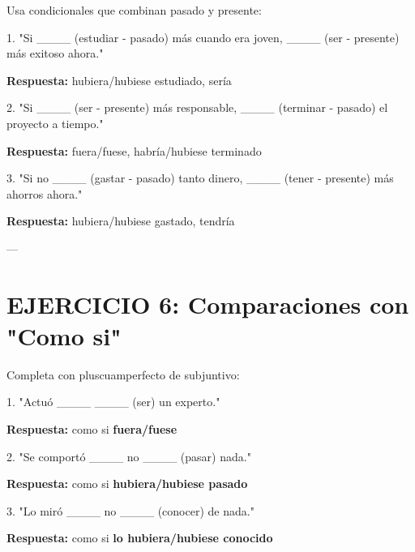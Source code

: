 \documentclass[a4paper,11pt]{article}
\begin{document}
\vspace{0.2cm}

Usa condicionales que combinan pasado y presente:

\vspace{0.2cm}

1. "Si ____ (estudiar - pasado) más cuando era joven, ____ (ser - presente) más exitoso ahora."

\textbf{Respuesta:} hubiera/hubiese estudiado, sería

\vspace{0.2cm}

2. "Si ____ (ser - presente) más responsable, ____ (terminar - pasado) el proyecto a tiempo."

\textbf{Respuesta:} fuera/fuese, habría/hubiese terminado

\vspace{0.2cm}

3. "Si no ____ (gastar - pasado) tanto dinero, ____ (tener - presente) más ahorros ahora."

\textbf{Respuesta:} hubiera/hubiese gastado, tendría

\vspace{0.2cm}

---

\vspace{0.2cm}

\section{EJERCICIO 6: Comparaciones con "Como si"}

\vspace{0.2cm}

Completa con pluscuamperfecto de subjuntivo:

\vspace{0.2cm}

1. "Actuó ____ ____ (ser) un experto."

\textbf{Respuesta:} como si \textbf{fuera/fuese}

\vspace{0.2cm}

2. "Se comportó ____ no ____ (pasar) nada."

\textbf{Respuesta:} como si \textbf{hubiera/hubiese pasado}

\vspace{0.2cm}

3. "Lo miró ____ no ____ (conocer) de nada."

\textbf{Respuesta:} como si \textbf{lo hubiera/hubiese conocido}
\end{document}
